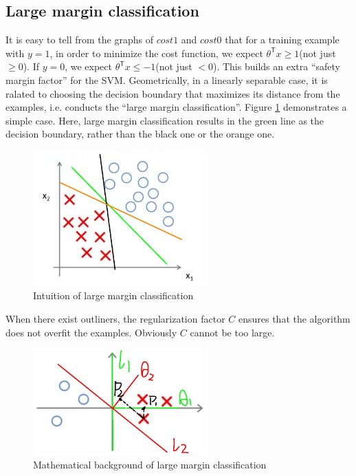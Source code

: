 \subsection{Large margin classification}
It is easy to tell from the graphs of $cost1$ and $cost0$ that for a training example with $y=1$, in order to minimize the cost function, we expect $\theta^{\mathsf T}x \ge 1$(not just $\ge 0$). If $y=0$, we expect $\theta^{\mathsf T}x \le -1$(not just $<0$). This builds an extra ``safety margin factor'' for the SVM. Geometrically, in a linearly separable case, it is ralated to choosing the decision boundary that maximizes its distance from the examples, i.e. conducts the ``large margin classification''. Figure \ref{largemargin} demonstrates a simple case. Here, large margin classification results in the green line as the decision boundary, rather than the black one or the orange one. 
\begin{figure}[H]
\centering
\includegraphics[width = 0.6\textwidth]{largemargin.jpg}
\caption{Intuition of large margin classification}\label{largemargin}
\end{figure}
When there exist outliners, the regularization factor $C$ ensures that the algorithm does not overfit the examples. Obviously $C$ cannot be too large.
\begin{figure}[H]
\centering
\includegraphics[width = 0.6\textwidth]{largemarginmath.jpg}
\caption{Mathematical background of large margin classification}\label{largemarginmath}
\end{figure}

